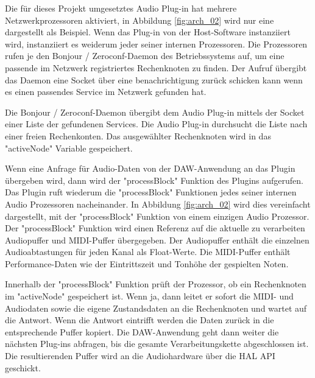 Die für dieses Projekt umgesetztes Audio Plug-in hat mehrere Netzwerkprozessoren aktiviert, in Abbildung \ref{fig:arch_02} wird nur eine dargestellt als Beispiel. Wenn das Plug-in von der Host-Software instanziiert wird, instanziiert es weiderum jeder seiner internen Prozessoren. Die Prozessoren rufen je den Bonjour / Zeroconf-Daemon des Betriebssystems auf, um eine passende im Netzwerk registriertes Rechenknoten zu finden. Der Aufruf übergibt das Daemon eine Socket über eine benachrichtigung zurück schicken kann wenn es einen passendes Service im Netzwerk gefunden hat.

Die Bonjour / Zeroconf-Daemon übergibt dem Audio Plug-in mittels der Socket einer Liste der gefundenen Services. Die Audio Plug-in durchsucht die Liste nach einer freien Rechenkonten. Das ausgewählter Rechenknoten wird in das "activeNode" Variable gespeichert.

Wenn eine Anfrage für Audio-Daten von der DAW-Anwendung an das Plugin übergeben wird, dann wird der "processBlock" Funktion des Plugins aufgerufen. Das Plugin ruft wiederum die "processBlock" Funktionen jedes seiner internen Audio Prozessoren nacheinander. In Abbildung \ref{fig:arch_02} wird dies vereinfacht dargestellt, mit der "processBlock" Funktion von einem einzigen Audio Prozessor. Der "processBlock" Funktion wird einen Referenz auf die aktuelle zu verarbeiten Audiopuffer und MIDI-Puffer übergegeben. Der Audiopuffer enthält die einzelnen Audioabtastungen für jeden Kanal als Float-Werte. Die MIDI-Puffer enthält Performance-Daten wie der Eintrittszeit und Tonhöhe der gespielten Noten.

Innerhalb der "processBlock" Funktion prüft der Prozessor, ob ein Rechenknoten im "activeNode" gespeichert ist. Wenn ja, dann leitet er sofort die MIDI- und Audiodaten sowie die eigene Zustandsdaten an die Rechenknoten und wartet auf die Antwort. Wenn die Antwort eintrifft werden die Daten zurück in die entsprechende Puffer kopiert. Die DAW-Anwendung geht dann weiter die nächsten Plug-ins abfragen, bis die gesamte Verarbeitungskette abgeschlossen ist. Die resultierenden Puffer wird an die Audiohardware über die HAL API geschickt.